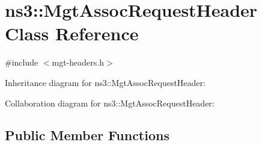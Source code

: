 \hypertarget{classns3_1_1MgtAssocRequestHeader}{}\section{ns3\+:\+:Mgt\+Assoc\+Request\+Header Class Reference}
\label{classns3_1_1MgtAssocRequestHeader}


{\ttfamily \#include $<$mgt-\/headers.\+h$>$}



Inheritance diagram for ns3\+:\+:Mgt\+Assoc\+Request\+Header\+:


Collaboration diagram for ns3\+:\+:Mgt\+Assoc\+Request\+Header\+:
\subsection*{Public Member Functions}
